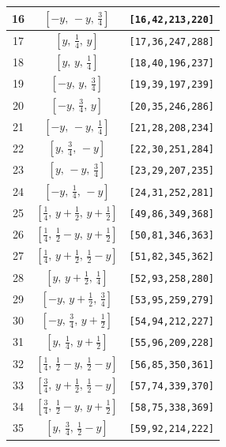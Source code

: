 \documentclass[fleqn,8pt]{jsarticle}
\begin{document}
\begin{longtable}{ccc}
16 & $\left[ - y,\, - y,\, \frac{3}{4} \right]$ & {\tt [16,42,213,220]} \\ \hline
17 & $\left[ y,\, \frac{1}{4},\, y \right]$ & {\tt [17,36,247,288]} \\ \hline
18 & $\left[ y,\, y,\, \frac{1}{4} \right]$ & {\tt [18,40,196,237]} \\ \hline
19 & $\left[ - y,\, y,\, \frac{3}{4} \right]$ & {\tt [19,39,197,239]} \\ \hline
20 & $\left[ - y,\, \frac{3}{4},\, y \right]$ & {\tt [20,35,246,286]} \\ \hline
21 & $\left[ - y,\, - y,\, \frac{1}{4} \right]$ & {\tt [21,28,208,234]} \\ \hline
22 & $\left[ y,\, \frac{3}{4},\, - y \right]$ & {\tt [22,30,251,284]} \\ \hline
23 & $\left[ y,\, - y,\, \frac{3}{4} \right]$ & {\tt [23,29,207,235]} \\ \hline
24 & $\left[ - y,\, \frac{1}{4},\, - y \right]$ & {\tt [24,31,252,281]} \\ \hline
25 & $\left[ \frac{1}{4},\, y + \frac{1}{2},\, y + \frac{1}{2} \right]$ & {\tt [49,86,349,368]} \\ \hline
26 & $\left[ \frac{1}{4},\, \frac{1}{2} - y,\, y + \frac{1}{2} \right]$ & {\tt [50,81,346,363]} \\ \hline
27 & $\left[ \frac{1}{4},\, y + \frac{1}{2},\, \frac{1}{2} - y \right]$ & {\tt [51,82,345,362]} \\ \hline
28 & $\left[ y,\, y + \frac{1}{2},\, \frac{1}{4} \right]$ & {\tt [52,93,258,280]} \\ \hline
29 & $\left[ - y,\, y + \frac{1}{2},\, \frac{3}{4} \right]$ & {\tt [53,95,259,279]} \\ \hline
30 & $\left[ - y,\, \frac{3}{4},\, y + \frac{1}{2} \right]$ & {\tt [54,94,212,227]} \\ \hline
31 & $\left[ y,\, \frac{1}{4},\, y + \frac{1}{2} \right]$ & {\tt [55,96,209,228]} \\ \hline
32 & $\left[ \frac{1}{4},\, \frac{1}{2} - y,\, \frac{1}{2} - y \right]$ & {\tt [56,85,350,361]} \\ \hline
33 & $\left[ \frac{3}{4},\, y + \frac{1}{2},\, \frac{1}{2} - y \right]$ & {\tt [57,74,339,370]} \\ \hline
34 & $\left[ \frac{3}{4},\, \frac{1}{2} - y,\, y + \frac{1}{2} \right]$ & {\tt [58,75,338,369]} \\ \hline
35 & $\left[ y,\, \frac{3}{4},\, \frac{1}{2} - y \right]$ & {\tt [59,92,214,222]} \\ \hline

\end{longtable}
\end{document}
